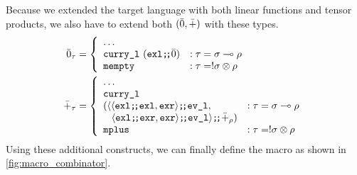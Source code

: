   Because we extended the target language with both linear functions and tensor products, we also have to extend both $(\bar{0}, \bar{+})$ with these types.
  \begin{align*}
    \bar{0}_\tau &=
      \left\{
        \begin{array}{ll}
          \dots \\
          \texttt{curry\_l}\ (\texttt{exl} \texttt{;\!;} \bar{0}) & : \tau = \sigma \multimap \rho \\
          \texttt{mempty} & : \tau = !\sigma\otimes\rho \\
        \end{array}
      \right. \\
    \bar{+}_\tau &=
      \left\{
        \begin{array}{ll}
          \dots \\
          \texttt{curry\_l}\  \\
            (\langle
              \langle \texttt{exl} \texttt{;\!;} \texttt{exl}, \texttt{exr} \rangle \texttt{;\!;} \texttt{ev\_l}, & : \tau = \sigma \multimap \rho \\
              \;\;\;\langle \texttt{exl} \texttt{;\!;} \texttt{exr}, \texttt{exr} \rangle \texttt{;\!;} \texttt{ev\_l} \rangle \texttt{;\!;} \bar{+}_\rho) \\
          \texttt{mplus} & : \tau = !\sigma\otimes\rho \\
        \end{array}
      \right.
  \end{align*}
  Using these additional constructs, we can finally define the macro as shown in \cref{fig:macro_combinator}.

